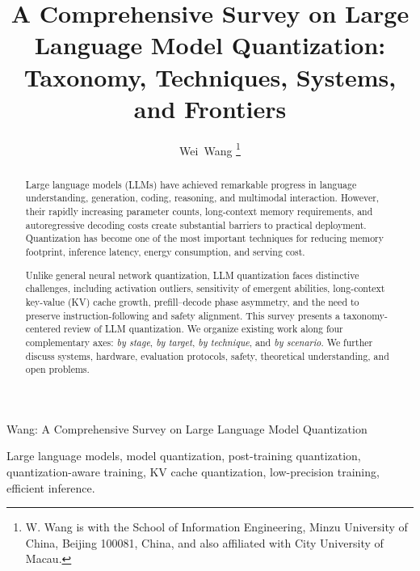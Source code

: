 \documentclass[journal,10pt]{IEEEtran}
\begin{document}
\title{A Comprehensive Survey on Large Language Model Quantization:\\
Taxonomy, Techniques, Systems, and Frontiers}

\author{
  Wei~Wang
  \thanks{W. Wang is with the School of Information Engineering, Minzu University of China, Beijing 100081, China, and also affiliated with City University of Macau.}
}

{Wang: A Comprehensive Survey on Large Language Model Quantization}

\maketitle

\begin{abstract}
Large language models (LLMs) have achieved remarkable progress in language understanding, generation, coding, reasoning, and multimodal interaction. However, their rapidly increasing parameter counts, long-context memory requirements, and autoregressive decoding costs create substantial barriers to practical deployment. Quantization has become one of the most important techniques for reducing memory footprint, inference latency, energy consumption, and serving cost.

Unlike general neural network quantization, LLM quantization faces distinctive challenges, including activation outliers, sensitivity of emergent abilities, long-context key-value (KV) cache growth, prefill--decode phase asymmetry, and the need to preserve instruction-following and safety alignment. This survey presents a taxonomy-centered review of LLM quantization. We organize existing work along four complementary axes: \emph{by stage}, \emph{by target}, \emph{by technique}, and \emph{by scenario}. We further discuss systems, hardware, evaluation protocols, safety, theoretical understanding, and open problems.
\end{abstract}

\begin{IEEEkeywords}
Large language models, model quantization, post-training quantization, quantization-aware training, KV cache quantization, low-precision training, efficient inference.
\end{IEEEkeywords}
\end{document}
